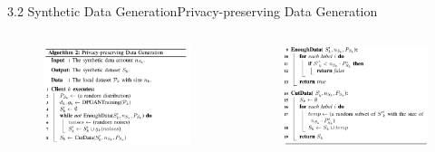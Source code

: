 \documentclass{sintefbeamer}
\theoremstyle{definition}
\begin{document}
\begin{frame}{3.2 Synthetic Data Generation}{Privacy-preserving Data Generation}


\begin{columns}
\begin{column}{0.5\textwidth}
\begin{figure}[ht]
\centering
\includegraphics[width=1\textwidth]{images/algo2_1}
\end{figure}

\end{column}
\begin{column}{0.5\textwidth}
\begin{figure}[ht]
\centering
\includegraphics[width=1\textwidth]{images/algo2_2}
\end{figure}
\end{column}
\end{columns}


\end{frame}
\end{document}
